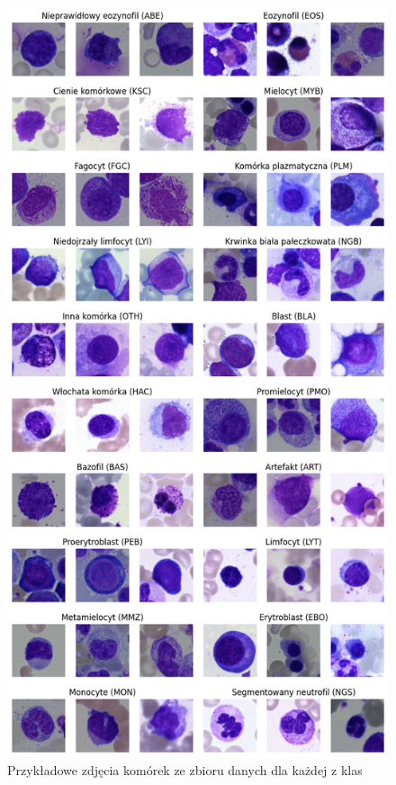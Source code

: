 \begin{figure}
    \centering
    \includegraphics[height=0.9\textheight]{images_examples}
    \caption{Przykładowe zdjęcia komórek ze zbioru danych dla każdej z klas}
    \label{fig:images_examples}
\end{figure}

